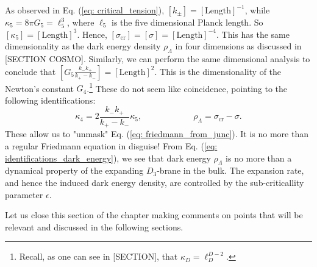 As observed in Eq. (\ref{eq: critical_tension}), $[k_{\pm}] = [\text{Length}]^{-1}$, while $\kappa_{5} = 8 \pi G_{5} = \ell_{5}^{3}$, where $\ell_{5}$ is the five dimensional Planck length. So $[\kappa_{5}] = [\text{Length}]^{3}$. Hence, $[\sigma_{\text{cr}}] = [\sigma] = [\text{Length}]^{-4}$. This has the same dimensionality as the dark energy density $\rho_{\Lambda}$ in four dimensions as discussed in [SECTION COSMO]. Similarly, we can perform the same dimensional analysis to conclude that $\left[G_{5} \tfrac{k_{-}k_{+}}{k_{+} - k_{-}}\right] = [\text{Length}]^{2}$. This is the dimensionality of the Newton's constant $G_{4}$.\footnote{Recall, as one can see in [SECTION], that $\kappa_{D} = \ell^{D-2}_{D}$.} These do not seem like coincidence, pointing to the following identifications:
\begin{equation}\label{eq: identifications_dark_energy}
	\kappa_{4} = 2 \frac{k_{-}k_{+}}{k_{+} - k_{-}} \kappa_{5}, \qquad \qquad \qquad \rho_{\Lambda} = \sigma_{\text{cr}} - \sigma.
\end{equation}
These allow us to "unmask" Eq. (\ref{eq: friedmann_from_junc}). It is no more than a regular Friedmann equation in disguise! From Eq. (\ref{eq: identifications_dark_energy}), we see that dark energy $\rho_{\Lambda}$ is no more than a dynamical property of the expanding $D_{3}$-brane in the bulk. The expansion rate, and hence the induced dark energy density, are controlled by the sub-criticallity parameter $\epsilon$. 

Let us close this section of the chapter making comments on points that will be relevant and discussed in the following sections.

